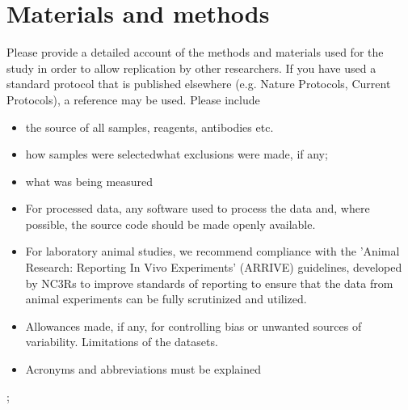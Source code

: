 \section{Materials and methods}
Please provide a detailed account of the methods and materials used for the study in order to allow replication by other researchers.
If you have used a standard protocol that is published elsewhere (e.g. Nature Protocols, Current Protocols), a reference may be used. Please include \begin{itemize}
\item
the source of all samples, reagents, antibodies etc.
\item
 how samples were selectedwhat exclusions were made, if any;
\item
what was being measured
\item
For processed data, any software used to process the data and, where possible, the source code should be made openly available.\item

For laboratory animal studies, we recommend compliance with the 'Animal Research: Reporting In Vivo Experiments' (ARRIVE) guidelines, developed by NC3Rs to improve standards of reporting to ensure that the data from animal experiments can be fully scrutinized and utilized.\item

Allowances made, if any, for controlling bias or unwanted sources of variability.
Limitations of the datasets.\item

Acronyms and abbreviations must be explained
\end{itemize};
